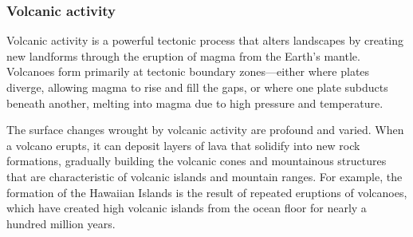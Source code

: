 


\subsubsection{Volcanic activity}
Volcanic activity is a powerful tectonic process that alters landscapes by creating new landforms through the eruption of magma from the Earth's mantle. Volcanoes form primarily at tectonic boundary zones—either where plates diverge, allowing magma to rise and fill the gaps, or where one plate subducts beneath another, melting into magma due to high pressure and temperature.

The surface changes wrought by volcanic activity are profound and varied. When a volcano erupts, it can deposit layers of lava that solidify into new rock formations, gradually building the volcanic cones and mountainous structures that are characteristic of volcanic islands and mountain ranges. For example, the formation of the Hawaiian Islands is the result of repeated eruptions of volcanoes, which have created high volcanic islands from the ocean floor for nearly a hundred million years.


